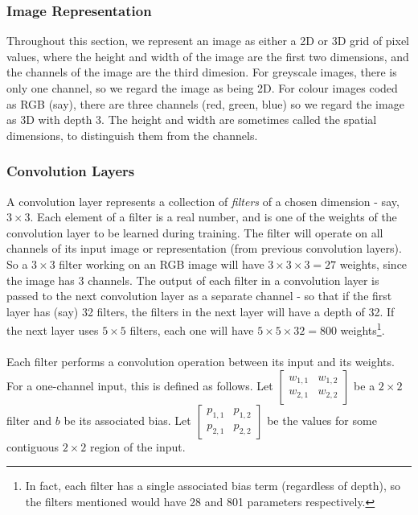 \documentclass[11pt]{article} %
\theoremstyle{plain}
\theoremstyle{definition}
\begin{document}
\subsubsection{Image Representation}
Throughout this section, we represent an image as either a 2D or 3D grid of pixel values, where the height and width of the image are the first two dimensions, and the channels of the image are the third dimesion. For greyscale images, there is only one channel, so we regard the image as being 2D. For colour images coded as RGB (say), there are three channels (red, green, blue) so we regard the image as 3D with depth 3. The height and width are sometimes called the spatial dimensions, to distinguish them from the channels.  

\subsubsection{Convolution Layers}
A convolution layer represents a collection of \textit{filters} of a chosen dimension - say, \(3 \times 3\). Each element of a filter is a real number, and is one of the weights of the convolution layer to be learned during training. The filter will operate on all channels of its input image or representation (from previous convolution layers). So a \(3 \times 3\) filter working on an RGB image will have \(3 \times 3 \times 3 = 27\) weights, since the image has 3 channels. The output of each filter in a convolution layer is passed to the next convolution layer as a separate channel - so that if the first layer has (say) 32 filters, the filters in the next layer will have a depth of 32. If the next layer uses \(5 \times 5\) filters, each one will have \(5 \times 5 \times 32 = 800\) weights\footnote{In fact, each filter has a single associated bias term (regardless of depth), so the filters mentioned would have 28 and 801 parameters respectively.}.    
\\
\\
\noindent
Each filter performs a convolution operation between its input and its weights. For a one-channel input, this is defined as follows. Let $\begin{bmatrix}w_{1,1} & w_{1,2}\\ w_{2,1} & w_{2,2}\end{bmatrix}$ be a \(2 \times 2\) filter and \(b\) be its associated bias. Let $\begin{bmatrix}p_{1,1} & p_{1,2}\\ p_{2,1} & p_{2,2}\end{bmatrix}$ be the values for some contiguous \(2 \times 2\) region of the input.
\end{document}
